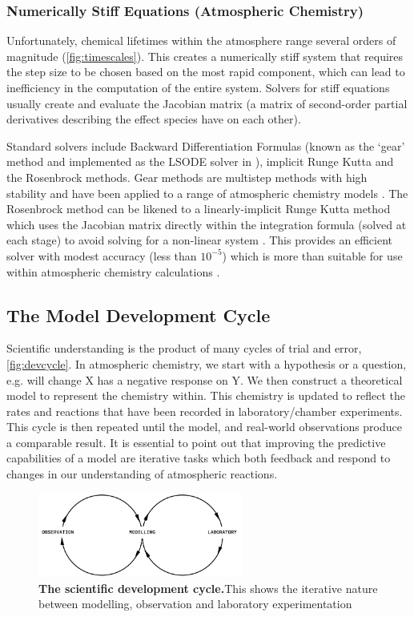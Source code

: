\subsubsection{Numerically Stiff Equations (Atmospheric Chemistry)}
Unfortunately, chemical lifetimes within the atmosphere range several orders of magnitude (\autoref{fig:timescales}). This creates a numerically stiff system that requires the step size to be chosen based on the most rapid component, which can lead to inefficiency in the computation of the entire system. Solvers for stiff equations usually create and evaluate the Jacobian matrix (a matrix of second-order partial derivatives describing the effect species have on each other). 

Standard solvers include Backward Differentiation Formulas (known as the `gear' method and implemented as the LSODE solver in \citep{kpp}),  implicit Runge Kutta and the Rosenbrock methods. Gear methods are multistep methods with high stability and have been applied to a range of atmospheric chemistry models \citep{gear, geos, fundamentals}. 
The Rosenbrock method can be likened to a linearly-implicit Runge Kutta method which uses the Jacobian matrix directly within the integration formula (solved at each stage) to avoid solving for a non-linear system \citep{solvers}. This provides an efficient solver with modest accuracy (less than $10^{-5}$) which is more than suitable for use within atmospheric chemistry calculations \citep{solvers,rosenbrock}. 


\subsection{The Model Development Cycle}
Scientific understanding is the product of many cycles of trial and error, \autoref{fig:devcycle}. In atmospheric chemistry, we start with a hypothesis or a question, e.g. will change X has a negative response on Y. We then construct a theoretical model to represent the chemistry within. This chemistry is updated to reflect the rates and reactions that have been recorded in laboratory/chamber experiments. This cycle is then repeated until the model, and real-world observations produce a comparable result.
It is essential to point out that improving the predictive capabilities of a model are iterative tasks which both feedback and respond to changes in our understanding of atmospheric reactions. 



\begin{figure}[H]
    \centering
    \includegraphics[width=0.6\textwidth]{devcycle.png}
    \caption{\textbf{The scientific development cycle.}This shows the iterative nature between modelling, observation and laboratory experimentation}
    \label{fig:devcycle}
\end{figure}

